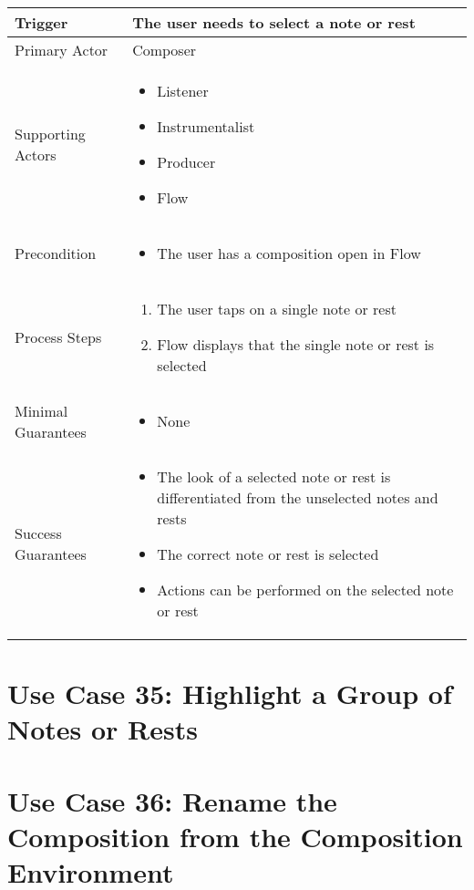   \begin{tabularx}{\textwidth}{|X|X|}
  \hline
  Trigger & 
  The user needs to select a note or rest \\
  \hline
  Primary Actor & 
  Composer \\
  \hline
  Supporting Actors & 
  \begin{itemize}
  \item Listener
  \item Instrumentalist
  \item Producer
  \item Flow
  \end{itemize} \\
  \hline
  Precondition & 
  \begin{itemize}
  \item The user has a composition open in Flow
  \end{itemize} \\
  \hline
  Process Steps & 
  \begin{enumerate}
  \item The user taps on a single note or rest
  \item Flow displays that the single note or rest is selected
  \end{enumerate} \\
  \hline
  Minimal Guarantees & 
  \begin{itemize}
    \item None
  \end{itemize} \\
  \hline
  Success Guarantees & 
  \begin{itemize}
    \item The look of a selected note or rest is differentiated from the unselected notes and rests
    \item The correct note or rest is selected
    \item Actions can be performed on the selected note or rest
  \end{itemize} \\
  \hline
  \end{tabularx}


  \section{Use Case 35: Highlight a Group of Notes or Rests}


  \section{Use Case 36: Rename the Composition from the Composition Environment}

